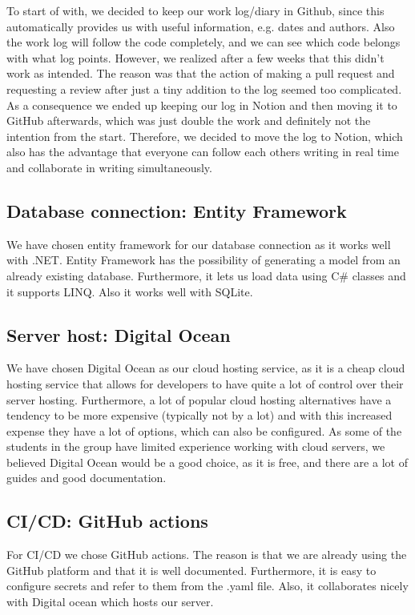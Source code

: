 To start of with, we decided to keep our work log/diary in Github, since this automatically provides us with useful information, e.g. dates and authors. Also the work log will follow the code completely, and we can see which code belongs with what log points. However, we realized after a few weeks that this didn’t work as intended. The reason was that the action of making a pull request and requesting a review after just a tiny addition to the log seemed too complicated.
As a consequence we ended up keeping our log in Notion and then moving it to GitHub afterwards, which was just double the work and definitely not the intention from the start.
Therefore, we decided to move the log to Notion, which also has the advantage that everyone can follow each others writing in real time and collaborate in writing simultaneously.

\subsection{Database connection: Entity Framework}

We have chosen entity framework for our database connection as it works well with .NET. Entity Framework has the possibility of generating a model from an already existing database. Furthermore, it lets us load data using C\# classes and it supports LINQ. Also it works well with SQLite.

\subsection{Server host: Digital Ocean}

We have chosen Digital Ocean as our cloud hosting service, as it is a cheap cloud hosting service that allows for developers to have quite a lot of control over their server hosting. Furthermore, a lot of popular cloud hosting alternatives have a tendency to be more expensive (typically not by a lot) and with this increased expense they have a lot of options, which can also be configured. As some of the students in the group have limited experience working with cloud servers, we believed Digital Ocean would be a good choice, as it is free, and there are a lot of guides and good documentation.

\subsection{CI/CD: GitHub actions}

For CI/CD we chose GitHub actions. The reason is that we are already using the GitHub platform and that it is well documented. Furthermore, it is easy to configure secrets and refer to them from the .yaml file. Also, it collaborates nicely with Digital ocean which hosts our server.

